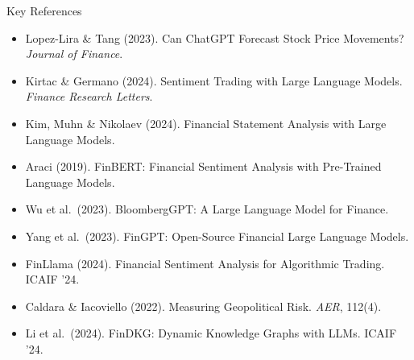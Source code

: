 \documentclass[aspectratio=169]{beamer}
\begin{document}
\begin{frame}{Key References}
{\scriptsize
\begin{itemize}\setlength{\itemsep}{2pt}
  \item Lopez-Lira \& Tang (2023). Can ChatGPT Forecast Stock Price Movements? \textit{Journal of Finance}.
  \item Kirtac \& Germano (2024). Sentiment Trading with Large Language Models. \textit{Finance Research Letters}.
  \item Kim, Muhn \& Nikolaev (2024). Financial Statement Analysis with Large Language Models.
  \item Araci (2019). FinBERT: Financial Sentiment Analysis with Pre-Trained Language Models.
  \item Wu et al.\ (2023). BloombergGPT: A Large Language Model for Finance.
  \item Yang et al.\ (2023). FinGPT: Open-Source Financial Large Language Models.
  \item FinLlama (2024). Financial Sentiment Analysis for Algorithmic Trading. ICAIF '24.
  \item Caldara \& Iacoviello (2022). Measuring Geopolitical Risk. \textit{AER}, 112(4).
  \item Li et al.\ (2024). FinDKG: Dynamic Knowledge Graphs with LLMs. ICAIF '24.
\end{itemize}
}
\end{frame}
\end{document}
